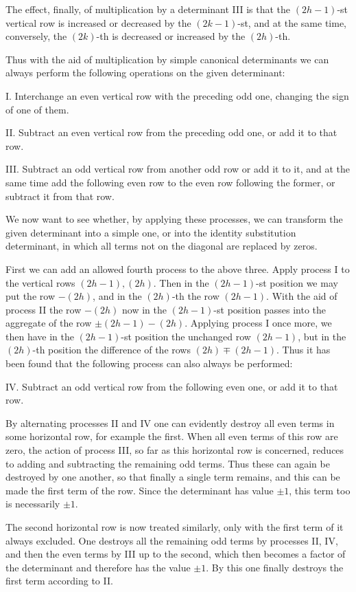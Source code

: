 \documentclass[10pt]{article}
\begin{document}
The effect, finally, of multiplication by a determinant III is that the \((2h-1)\)-st vertical row is increased or decreased by the \((2k-1)\)-st, and at the same time, conversely, the \((2k)\)-th is decreased or increased by the \((2h)\)-th.

Thus with the aid of multiplication by simple canonical determinants we can always perform the following operations on the given determinant:

I. Interchange an even vertical row with the preceding odd one, changing the sign of one of them.

II. Subtract an even vertical row from the preceding odd one, or add it to that row.

III. Subtract an odd vertical row from another odd row or add it to it, and at the same time add the following even row to the even row following the former, or subtract it from that row.

We now want to see whether, by applying these processes, we can transform the given determinant into a simple one, or into the identity substitution determinant, in which all terms not on the diagonal are replaced by zeros.

First we can add an allowed fourth process to the above three. Apply process I to the vertical rows \((2h-1),(2h)\). Then in the \((2h-1)\)-st position we may put the row \(-(2h)\), and in the \((2h)\)-th the row \((2h-1)\). With the aid of process II the row \(-(2h)\) now in the \((2h-1)\)-st position passes into the aggregate of the row \(\pm(2h-1)-(2h)\). Applying process I once more, we then have in the \((2h-1)\)-st position the unchanged row \((2h-1)\), but in the \((2h)\)-th position the difference of the rows \((2h)\mp(2h-1)\). Thus it has been found that the following process can also always be performed:

IV. Subtract an odd vertical row from the following even one, or add it to that row.

By alternating processes II and IV one can evidently destroy all even terms in some horizontal row, for example the first. When all even terms of this row are zero, the action of process III, so far as this horizontal row is concerned, reduces to adding and subtracting the remaining odd terms. Thus these can again be destroyed by one another, so that finally a single term remains, and this can be made the first term of the row. Since the determinant has value \(\pm1\), this term too is necessarily \(\pm1\).

The second horizontal row is now treated similarly, only with the first term of it always excluded. One destroys all the remaining odd terms by processes II, IV, and then the even terms by III up to the second, which then becomes a factor of the determinant and therefore has the value \(\pm1\). By this one finally destroys the first term according to II.
\end{document}

